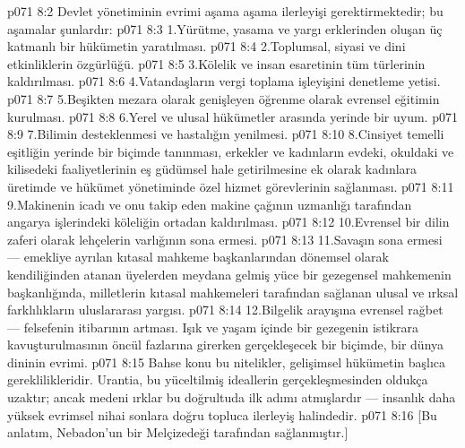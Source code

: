 \vs p071 8:2 Devlet yönetiminin evrimi aşama aşama ilerleyişi gerektirmektedir; bu aşamalar şunlardır:
\vs p071 8:3 1.\bibnobreakspace Yürütme, yasama ve yargı erklerinden oluşan üç katmanlı bir hükümetin yaratılması.
\vs p071 8:4 2.\bibnobreakspace Toplumsal, siyasi ve dini etkinliklerin özgürlüğü.
\vs p071 8:5 3.\bibnobreakspace Kölelik ve insan esaretinin tüm türlerinin kaldırılması.
\vs p071 8:6 4.\bibnobreakspace Vatandaşların vergi toplama işleyişini denetleme yetisi.
\vs p071 8:7 5.\bibnobreakspace Beşikten mezara olarak genişleyen öğrenme olarak evrensel eğitimin kurulması.
\vs p071 8:8 6.\bibnobreakspace Yerel ve ulusal hükümetler arasında yerinde bir uyum.
\vs p071 8:9 7.\bibnobreakspace Bilimin desteklenmesi ve hastalığın yenilmesi.
\vs p071 8:10 8.\bibnobreakspace Cinsiyet temelli eşitliğin yerinde bir biçimde tanınması, erkekler ve kadınların evdeki, okuldaki ve kilisedeki faaliyetlerinin eş güdümsel hale getirilmesine ek olarak kadınlara üretimde ve hükümet yönetiminde özel hizmet görevlerinin sağlanması.
\vs p071 8:11 9.\bibnobreakspace Makinenin icadı ve onu takip eden makine çağının uzmanlığı tarafından angarya işlerindeki köleliğin ortadan kaldırılması.
\vs p071 8:12 10.\bibnobreakspace Evrensel bir dilin zaferi olarak lehçelerin varlığının sona ermesi.
\vs p071 8:13 11.\bibnobreakspace Savaşın sona ermesi --- emekliye ayrılan kıtasal mahkeme başkanlarından dönemsel olarak kendiliğinden atanan üyelerden meydana gelmiş yüce bir gezegensel mahkemenin başkanlığında, milletlerin kıtasal mahkemeleri tarafından sağlanan ulusal ve ırksal farklılıkların uluslararası yargısı.
\vs p071 8:14 12.\bibnobreakspace Bilgelik arayışına evrensel rağbet --- felsefenin itibarının artması. Işık ve yaşam içinde bir gezegenin istikrara kavuşturulmasının öncül fazlarına girerken gerçekleşecek bir biçimde, bir dünya dininin evrimi.
\vs p071 8:15 Bahse konu bu nitelikler, gelişimsel hükümetin başlıca gereklilikleridir. Urantia, bu yüceltilmiş ideallerin gerçekleşmesinden oldukça uzaktır; ancak medeni ırklar bu doğrultuda ilk adımı atmışlardır --- insanlık daha yüksek evrimsel nihai sonlara doğru topluca ilerleyiş halindedir.
\vs p071 8:16 [Bu anlatım, Nebadon’un bir Melçizedeği tarafından sağlanmıştır.]
